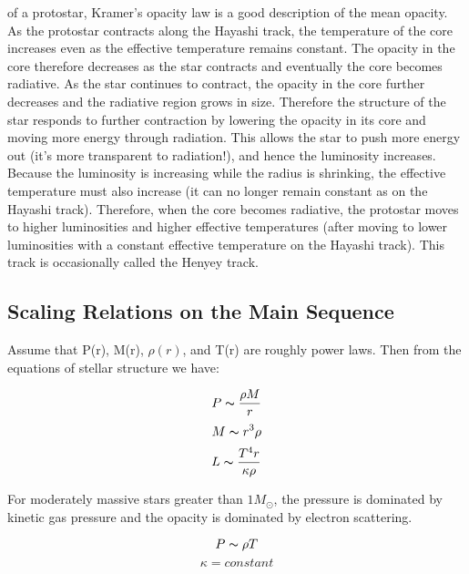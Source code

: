 of a protostar, Kramer's opacity law is a good description of the mean opacity.
As the protostar contracts along the Hayashi track, the temperature of the core increases
even as the effective temperature remains constant.  The opacity in the core therefore decreases
as the star contracts and eventually the core becomes radiative.  As the star continues to
contract, the opacity in the core further decreases and the radiative region grows in size.
Therefore the structure of the star responds to further contraction by lowering the opacity
in its core and moving more energy through radiation.  This allows the star to push more energy
out (it's more transparent to radiation!), and hence the luminosity increases.  Because the
luminosity is increasing while the radius is shrinking, the effective temperature must also
increase (it can no longer remain constant as on the Hayashi track).  Therefore, when the core becomes radiative, the protostar moves to higher luminosities and
higher effective temperatures (after moving to lower luminosities with a constant effective
temperature on the Hayashi track).  This track is occasionally called the Henyey track.

\subsection{Scaling Relations on the Main Sequence}
Assume that P(r), M(r), $\rho (r)$, and T(r) are roughly power laws.  Then from the equations of stellar structure we have:

\begin{equation}
P \thicksim \frac{\rho M}{r}
\end{equation}
\begin{equation}
M \thicksim r^3\rho
\end{equation}
\begin{equation}
L \thicksim \frac{T^4r}{\kappa \rho}
\end{equation}

For moderately massive stars greater than $1 M_\odot$, the pressure is dominated by kinetic gas pressure and the opacity is dominated by electron scattering.

\begin{equation}
P \thicksim \rho T
\end{equation}
\begin{equation}
\kappa = constant
\end{equation}

